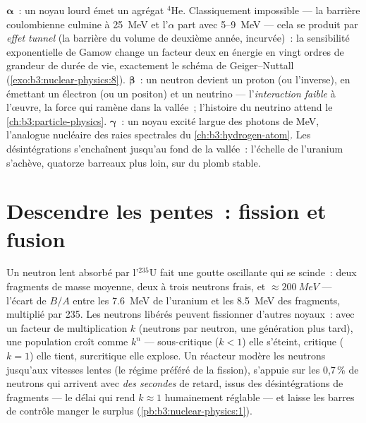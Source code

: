 \begin{remark}\label{rem:b3:nuclear-physics:modes}
$\boldsymbol\alpha$~: un noyau lourd émet un agrégat $^4$He.
Classiquement impossible --- la barrière coulombienne culmine à
\qty{25}{MeV} et l'$\alpha$ part avec \qty{5}{}--\qty{9}{MeV} ---
cela se produit par \emph{effet tunnel} (la barrière du volume de
deuxième année, incurvée)~: la sensibilité exponentielle de Gamow
change un facteur deux en énergie en vingt ordres de grandeur de
durée de vie, exactement le schéma de Geiger--Nuttall
(\cref{exo:b3:nuclear-physics:8}).
$\boldsymbol\beta$~: un neutron devient un proton (ou l'inverse), en
émettant un électron (ou un positon) et un neutrino ---
l'\emph{interaction faible} à l'œuvre, la force qui ramène dans la
vallée~; l'histoire du neutrino attend le
\cref{ch:b3:particle-physics}.
$\boldsymbol\gamma$~: un noyau excité largue des photons de
\unit{MeV}, l'analogue nucléaire des raies spectrales du
\cref{ch:b3:hydrogen-atom}. Les désintégrations s'enchaînent
jusqu'au fond de la vallée~: l'échelle de l'uranium s'achève, quatorze
barreaux plus loin, sur du plomb stable.
\end{remark}

\section{Descendre les pentes~: fission et fusion}

\begin{proposition}\label{prop:b3:nuclear-physics:fission}
Un neutron lent absorbé par l'$^{235}$U fait une goutte oscillante
qui se scinde~: deux fragments de masse moyenne, deux à trois
neutrons frais, et $\approx\qty{200}{MeV}$ --- l'écart de $B/A$ entre
les \qty{7.6}{MeV} de l'uranium et les \qty{8.5}{MeV} des fragments,
multiplié par 235. Les neutrons libérés peuvent fissionner d'autres
noyaux~: avec un facteur de multiplication $k$ (neutrons par neutron,
une génération plus tard), une population croît comme $k^n$ ---
sous-critique ($k < 1$) elle s'éteint, critique ($k = 1$) elle tient,
surcritique elle explose. Un réacteur modère les neutrons jusqu'aux
vitesses lentes (le régime préféré de la fission), s'appuie sur les
0,7\,\% de neutrons qui arrivent avec \emph{des secondes} de retard,
issus des désintégrations de fragments --- le délai qui rend
$k \approx 1$ humainement réglable --- et laisse les barres de
contrôle manger le surplus (\cref{pb:b3:nuclear-physics:1}).
\end{proposition}
\admitted

